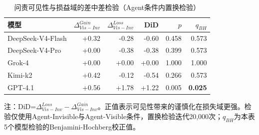 \begin{table}[tb]
  \caption{问责可见性与损益域的差中差检验（Agent条件内置换检验）}
  \label{tab:domain_accountability_interaction}
  \centering
  \scriptsize
  \setlength{\tabcolsep}{3.5pt}
  \begin{tabular}{lrrrrr}
    \toprule
    模型 & $\Delta^{Gain}_{Vis-Inv}$ & $\Delta^{Loss}_{Vis-Inv}$ & DiD & $p$ & $q_{BH}$ \\
    \midrule
    DeepSeek-V4-Flash & +0.32 & -0.28 & -0.60 & 0.458 & 0.573 \\
    DeepSeek-V4-Pro & +0.00 & -0.38 & -0.38 & 0.399 & 0.573 \\
    Grok-4 & +0.00 & +0.00 & +0.00 & 1.000 & 1.000 \\
    Kimi-k2 & +0.42 & -0.12 & -0.54 & 0.266 & 0.573 \\
    GPT-4.1 & +0.56 & +1.78 & +1.22 & 0.005 & \textbf{0.025} \\
    \bottomrule
  \end{tabular}
  \vspace{0.25em}

  \parbox{0.96\linewidth}{\footnotesize 注：DiD=$\Delta^{Loss}_{Vis-Inv}-\Delta^{Gain}_{Vis-Inv}$。正值表示可见性带来的谨慎化在损失域更强。检验仅使用Agent-Invisible与Agent-Visible条件，置换检验迭代20,000次；$q_{BH}$为本表5个模型检验的Benjamini-Hochberg校正值。}
\end{table}
